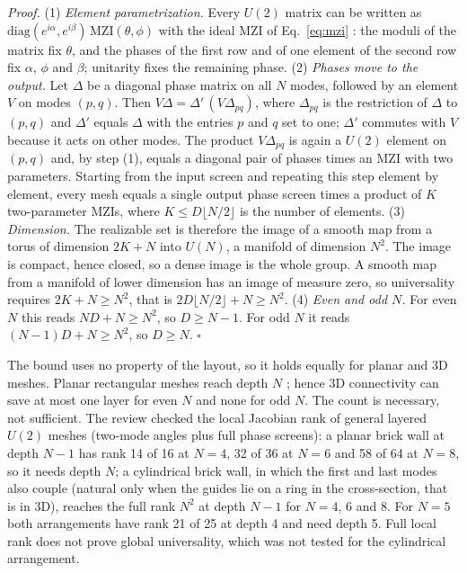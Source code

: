 \documentclass[11pt,a4paper]{article}
\begin{document}
\noindent\emph{Proof.} (1) \emph{Element parametrization.} Every $U(2)$ matrix can be written as $\mathrm{diag}(e^{i\alpha},e^{i\beta})\,\mathrm{MZI}(\theta,\phi)$ with the ideal MZI of Eq.~\eqref{eq:mzi} \cite{Clements2016}: the moduli of the matrix fix $\theta$, and the phases of the first row and of one element of the second row fix $\alpha$, $\phi$ and $\beta$; unitarity fixes the remaining phase.
(2) \emph{Phases move to the output.} Let $\Delta$ be a diagonal phase matrix on all $N$ modes, followed by an element $V$ on modes $(p,q)$. Then $V\Delta=\Delta'\,(V\Delta_{pq})$, where $\Delta_{pq}$ is the restriction of $\Delta$ to $(p,q)$ and $\Delta'$ equals $\Delta$ with the entries $p$ and $q$ set to one; $\Delta'$ commutes with $V$ because it acts on other modes. The product $V\Delta_{pq}$ is again a $U(2)$ element on $(p,q)$ and, by step (1), equals a diagonal pair of phases times an MZI with two parameters. Starting from the input screen and repeating this step element by element, every mesh equals a single output phase screen times a product of $K$ two-parameter MZIs, where $K\le D\lfloor N/2\rfloor$ is the number of elements.
(3) \emph{Dimension.} The realizable set is therefore the image of a smooth map from a torus of dimension $2K+N$ into $U(N)$, a manifold of dimension $N^2$. The image is compact, hence closed, so a dense image is the whole group. A smooth map from a manifold of lower dimension has an image of measure zero, so universality requires $2K+N\ge N^2$, that is $2D\lfloor N/2\rfloor+N\ge N^2$.
(4) \emph{Even and odd $N$.} For even $N$ this reads $ND+N\ge N^2$, so $D\ge N-1$. For odd $N$ it reads $(N-1)D+N\ge N^2$, so $D\ge N$. \hfill$\square$

\medskip
The bound uses no property of the layout, so it holds equally for planar and 3D meshes. Planar rectangular meshes reach depth $N$ \cite{Clements2016}; hence 3D connectivity can save at most one layer for even $N$ and none for odd $N$. The count is necessary, not sufficient. The review checked the local Jacobian rank of general layered $U(2)$ meshes (two-mode angles plus full phase screens): a planar brick wall at depth $N-1$ has rank 14 of 16 at $N=4$, 32 of 36 at $N=6$ and 58 of 64 at $N=8$, so it needs depth $N$; a cylindrical brick wall, in which the first and last modes also couple (natural only when the guides lie on a ring in the cross-section, that is in 3D), reaches the full rank $N^2$ at depth $N-1$ for $N=4$, 6 and 8. For $N=5$ both arrangements have rank 21 of 25 at depth 4 and need depth 5. Full local rank does not prove global universality, which was not tested for the cylindrical arrangement.
\end{document}
